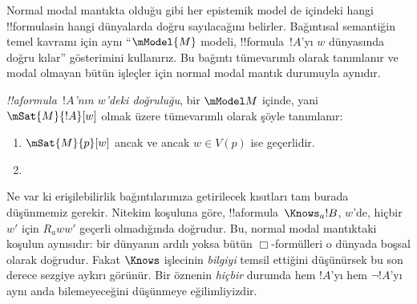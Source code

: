



Normal modal mantıkta olduğu gibi her epistemik model de içindeki hangi
!!{formula}s{}in hangi dünyalarda doğru sayılacağını belirler. Bağıntısal
semantiğin temel kavramı için aynı ``$\mModel{M}$ modeli, !!{formula}~$!A$'yı
$w$ dünyasında doğru kılar'' gösterimini kullanırız. Bu bağıntı tümevarımlı
olarak tanımlanır ve modal olmayan bütün işleçler için normal modal mantık
durumuyla aynıdır.

\begin{defn}
  \emph{!!a{formula}~$!A$'nın $w$'deki doğruluğu}, bir $\mModel M$ içinde,
  yani $\mSat{M}{!A}[w]$ olmak üzere tümevarımlı olarak şöyle tanımlanır:
  \begin{enumerate}
  \item $\mSat{M}{p}[w]$ ancak ve ancak $w \in V(p)$ ise geçerlidir.
  \item{}
  \end{enumerate} 
\end{defn}

Ne var ki erişilebilirlik bağıntılarımıza getirilecek kısıtları tam burada
düşünmemiz gerekir. Nitekim  koşuluna göre,
!!a{formula}~$\Knows_a !B$, $w$'de, hiçbir $w'$ için $R_a ww'$ geçerli
olmadığında doğrudur. Bu, normal modal mantıktaki koşulun aynısıdır: bir dünyanın
ardılı yoksa bütün $\Box$-formülleri o dünyada boşsal olarak doğrudur. Fakat
$\Knows$ işlecinin \emph{bilgiyi} temsil ettiğini düşünürsek bu son derece
sezgiye aykırı görünür. Bir öznenin \emph{hiçbir} durumda hem $!A$'yı hem
$\lnot !A$'yı aynı anda bilemeyeceğini düşünmeye eğilimliyizdir.

